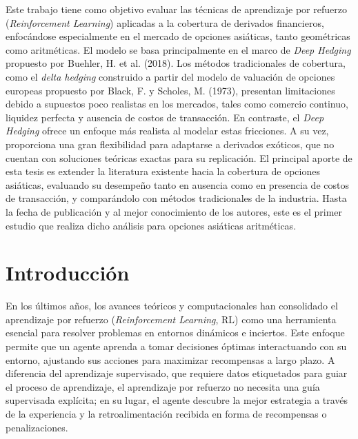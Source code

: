 \documentclass[11pt,a4paper,spanish]{article}
\numberwithin{equation}{section} %
\begin{document}
Este trabajo tiene como objetivo evaluar las técnicas de aprendizaje por refuerzo (\textit{Reinforcement Learning}) aplicadas a la cobertura de derivados financieros, enfocándose especialmente en el mercado de opciones asiáticas, tanto geométricas como aritméticas. El modelo se basa principalmente en el marco de \textit{Deep Hedging} propuesto por Buehler, H. et al. (2018). Los métodos tradicionales de cobertura, como el \textit{delta hedging} construido a partir del modelo de valuación de opciones europeas propuesto por Black, F. y Scholes, M. (1973), presentan limitaciones debido a supuestos poco realistas en los mercados, tales como comercio continuo, liquidez perfecta y ausencia de costos de transacción. En contraste, el \textit{Deep Hedging} ofrece un enfoque más realista al modelar estas fricciones. A su vez, proporciona una gran flexibilidad para adaptarse a derivados exóticos, que no cuentan con soluciones teóricas exactas para su replicación. El principal aporte de esta tesis es extender la literatura existente hacia la cobertura de opciones asiáticas, evaluando su desempeño tanto en ausencia como en presencia de costos de transacción, y comparándolo con métodos tradicionales de la industria. Hasta la fecha de publicación y al mejor conocimiento de los autores, este es el primer estudio que realiza dicho análisis para opciones asiáticas aritméticas.

\newpage

\section{Introducción}

En los últimos años, los avances teóricos y computacionales han consolidado el aprendizaje por refuerzo (\textit{Reinforcement Learning}, RL) como una herramienta esencial para resolver problemas en entornos dinámicos e inciertos. Este enfoque permite que un agente aprenda a tomar decisiones óptimas interactuando con su entorno, ajustando sus acciones para maximizar recompensas a largo plazo. A diferencia del aprendizaje supervisado, que requiere datos etiquetados para guiar el proceso de aprendizaje, el aprendizaje por refuerzo no necesita una guía supervisada explícita; en su lugar, el agente descubre la mejor estrategia a través de la experiencia y la retroalimentación recibida en forma de recompensas o penalizaciones.
\end{document}
